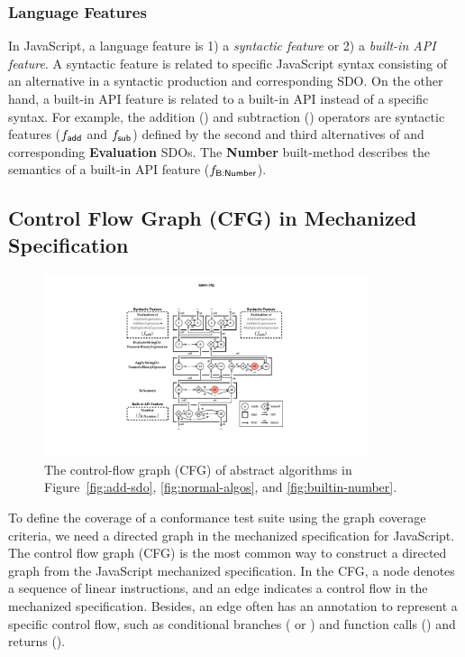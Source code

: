\subsubsection{Language Features}\label{sec:feat}

In JavaScript, a language feature is 1) a \textit{syntactic feature} or 2) a
\textit{built-in API feature}.
%
A syntactic feature is related to specific JavaScript syntax consisting of an
alternative in a syntactic production and corresponding SDO.
%
On the other hand, a built-in API feature is related to a built-in API instead
of a specific syntax.
%
For example, the addition (\scode{+}) and subtraction (\scode{-}) operators are
syntactic features ($f_{\textsf{add}}$ and $f_{\textsf{sub}}$) defined by the second and third
alternatives of  and corresponding \textbf{Evaluation}
SDOs.
%
The \textbf{Number} built-method describes the semantics of a built-in
 API feature ($f_{\textsf{B:Number}}$).


\subsection{Control Flow Graph (CFG) in Mechanized Specification}\label{sec:cfg}

\begin{figure}
  \centering
  \includegraphics[width=0.85\textwidth]{img/spec-cfg}
  \caption{
    The control-flow graph (CFG) of abstract algorithms in
    Figure~\ref{fig:add-sdo}, \ref{fig:normal-algos}, and
    \ref{fig:builtin-number}.
  }
  \label{fig:spec-cfg}
\end{figure}


To define the coverage of a conformance test suite using the graph coverage
criteria, we need a directed graph in the mechanized specification for
JavaScript.
%
The control flow graph (CFG) is the most common way to construct a directed
graph from the JavaScript mechanized specification.
%
In the CFG, a node denotes a sequence of linear instructions, and an edge
indicates a control flow in the mechanized specification.
%
Besides, an edge often has an annotation to represent a specific control flow,
such as conditional branches ( or ) and function calls
() and returns ().

